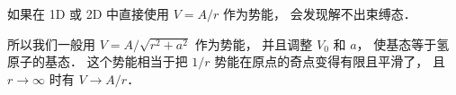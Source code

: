 
如果在 1D 或 2D 中直接使用 $V = A/r$ 作为势能， 会发现解不出束缚态．

所以我们一般用 $V = A/\sqrt{r^2 + a^2}$ 作为势能， 并且调整 $V_0$ 和 $a$， 使基态等于氢原子的基态． 这个势能相当于把 $1/r$ 势能在原点的奇点变得有限且平滑了， 且 $r\to\infty$ 时有 $V \to A/r$．

